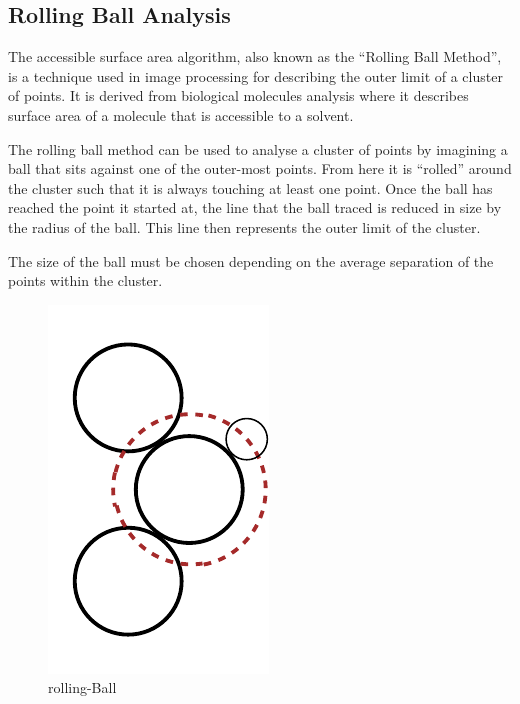 
\subsection{Rolling Ball Analysis}
\label{sub:rolling_ball_analysis}

The accessible surface area algorithm, also known as the ``Rolling Ball
Method'', is a technique used in image processing for describing the outer
limit of a cluster of points. It is derived from biological molecules analysis
where it describes surface area of a molecule that is accessible to a solvent.

The rolling ball method can be used to analyse a cluster of points by imagining
a ball that sits against one of the outer-most points. From here it is
``rolled'' around the cluster such that it is always touching at least one
point. Once the ball has reached the point it started at, the line that the ball
traced is reduced in size by the radius of the ball. This line then represents
the outer limit of the cluster.

The size of the ball must be chosen depending on the average separation of the
points within the cluster.

\begin{figure}[tbhp]
	\centering
	\includegraphics[width=0.5\linewidth]{rolling-ball.pdf}
	\caption{rolling-Ball}
	\label{fig:rolling-ball}
\end{figure}
